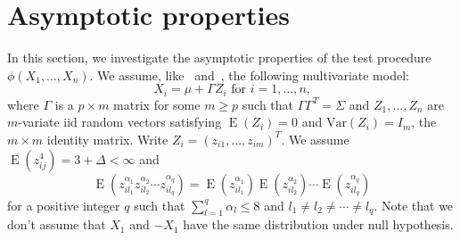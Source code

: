 \documentclass[review]{elsarticle}
\DeclareMathOperator{\myE}{E}
\theoremstyle{plain}
\theoremstyle{definition}
\theoremstyle{remark}
\begin{document}
\section{Asymptotic properties}
In this section, we investigate the asymptotic properties of the test procedure $\phi(X_1,\ldots,X_n)$.
We assume, like~\citet{Chen2010A} and~\citet{Bai1996Efiect}, the following multivariate model:
\begin{equation}\label{chenC1}
    \textrm{$X_i=\mu+\Gamma Z_i$  for  $i=1,\ldots,n$,}
\end{equation}
where $\Gamma$ is a $p\times m$ matrix for some $m\geq p$ such that $\Gamma\Gamma^T=\Sigma$ and $Z_{1},\ldots, Z_n$ are $m$-variate iid random vectors satisfying $\myE(Z_i)=0$ and $\mathrm{Var}(Z_i)=I_m$, the $m\times m$ identity matrix. Write $Z_i={(z_{i1},\ldots,z_{im})}^T$. We assume $\myE(z_{ij}^4)=3+\Delta<\infty$ and
\begin{equation}\label{chenC2}
    \myE(z_{il_1}^{\alpha_1}z_{il_2}^{\alpha_2}\cdots z_{il_q}^{\alpha_q})=\myE(z_{il_1}^{\alpha_1})\myE(z_{il_2}^{\alpha_2})\cdots \myE(z_{il_q}^{\alpha_q})
\end{equation}
for a positive integer $q$ such that $\sum_{l=1}^q \alpha_l\leq 8$ and $l_1\neq l_2\neq \cdots \neq l_q$.
Note that we don't assume that $X_1$ and $-X_1$  have the same distribution under null hypothesis.

\end{document}

